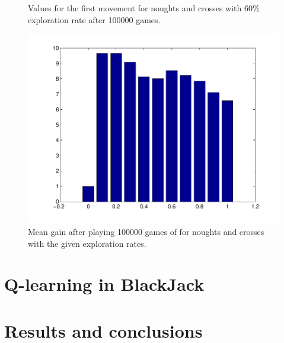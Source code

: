 \documentclass[12pt]{article}
\begin{document}
\begin{figure}[htbp!]
\begin{minipage}[t]{0.5\linewidth}
	\caption{Values for the first movement for noughts and crosses with 60\% exploration rate after 100000 games.}
	\label{fig:ttt_eps_0_6}
\end{minipage} 
\quad
\begin{minipage}[t]{0.45\linewidth}
	\includegraphics[scale=0.40]{images/tttExpectedGain}
	\caption{Mean gain after playing 100000 games of for noughts and crosses with the given exploration rates.}
	\label{fig:tttExpectedGain}
\end{minipage}
\end{figure}

\section{Q-learning in BlackJack}

\section{Results and conclusions}

%
%
\end{document}
